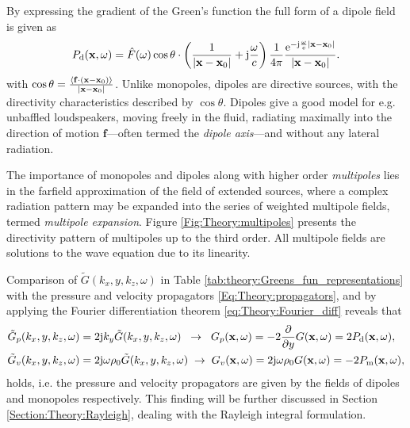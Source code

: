 \begin{itemize}
By expressing the gradient of the Green's function the full form of a dipole field is given as
\begin{equation}
P_{\mathrm{d}}(\mathbf{x},\omega) =  \hat{F}(\omega)
\cos \theta \cdot \left(  \frac{1}{|\mathbf{x}-\mathbf{x}_0|} + \mathrm{j} \frac{\omega}{c} \right)
\frac{1}{4\pi}
\frac{\mathrm{e}^{-\mathrm{j} \frac{\omega}{c}|\mathbf{x}-\mathbf{x}_0|}}{|\mathbf{x}-\mathbf{x}_0|}.
\end{equation}
with $\cos \theta = \frac{\left<\mathbf{f} \cdot (\mathbf{x}-\mathbf{x}_0) \right> } {|\mathbf{x}-\mathbf{x}_0|}$.
Unlike monopoles, dipoles are directive sources, with the directivity characteristics described by $\cos \theta$.
Dipoles give a good model for e.g. unbaffled loudspeakers, moving freely in the fluid, radiating maximally into the direction of motion $\mathbf{f}$---often termed the \emph{dipole axis}---and without any lateral radiation.
%
%
\end{itemize}
%
The importance of monopoles and dipoles along with higher order \emph{multipoles} lies in the farfield approximation of the field of extended sources, where a complex radiation pattern may be expanded into the series of weighted multipole fields, termed \emph{multipole expansion}.
Figure \ref{Fig:Theory:multipoles} presents the directivity pattern of multipoles up to the third order.
All multipole fields are solutions to the wave equation due to its linearity.

Comparison of $\tilde{G}(k_x,y,k_z,\omega)$ in Table \ref{tab:theory:Greens_fun_representations}  with the pressure and velocity propagators \eqref{Eq:Theory:propagators}, and by applying the Fourier differentiation theorem \eqref{eq:Theory:Fourier_diff} reveals that
\begin{align}
\tilde{G}_p(k_x,y,k_z,\omega) &=  2 \mathrm{j} k_y \tilde{G}(k_x,y,k_z,\omega) 
\hspace{2mm} \rightarrow \hspace{2mm} 
G_p(\mathbf{x},\omega) = -2 \frac{\partial}{\partial y} G(\mathbf{x},\omega) = 2 P_{\mathrm{d}}(\mathbf{x},\omega),
\\
\tilde{G}_v(k_x,y,k_z,\omega) &=  2 \mathrm{j} \omega \rho_0 \tilde{G}(k_x,y,k_z,\omega) 
\hspace{1mm} \rightarrow \hspace{1mm} 
G_v(\mathbf{x},\omega) = 2 \mathrm{j} \omega \rho_0 G(\mathbf{x},\omega) = -2P_{\mathrm{m}}(\mathbf{x},\omega),
\end{align}
holds, i.e. the pressure and velocity propagators are given by the fields of dipoles and monopoles respectively.
This finding will be further discussed in Section \ref{Section:Theory:Rayleigh}, dealing with the Rayleigh integral formulation.

